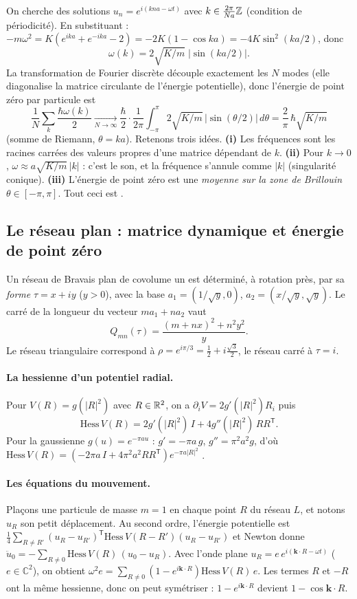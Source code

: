 On cherche des solutions $u_n=e^{i(kna-\omega t)}$ avec $k\in\tfrac{2\pi}{Na}\mathbb{Z}$ (condition de périodicité). En
substituant : $-m\omega^2=K(e^{ika}+e^{-ika}-2)=-2K(1-\cos ka)=-4K\sin^2(ka/2)$, donc
\[
\omega(k)=2\sqrt{K/m}\;\bigl|\sin(ka/2)\bigr| .
\]
La transformation de Fourier discrète découple exactement les $N$ modes (elle diagonalise la matrice circulante de
l'énergie potentielle), donc l'énergie de point zéro par particule est
\[
\frac1N\sum_k\frac{\hbar\omega(k)}2\xrightarrow[N\to\infty]{}\frac{\hbar}{2}\cdot\frac1{2\pi}\int_{-\pi}^{\pi}2\sqrt{K/m}\,
|\sin(\theta/2)|\,d\theta=\frac{2}{\pi}\,\hbar\sqrt{K/m}
\]
(somme de Riemann, $\theta=ka$). Retenons trois idées. \textbf{(i)} Les fréquences sont les racines carrées des valeurs
propres d'une matrice dépendant de $k$. \textbf{(ii)} Pour $k\to0$, $\omega\approx a\sqrt{K/m}\,|k|$ : c'est le son, et
la fréquence s'annule comme $|k|$ (singularité conique). \textbf{(iii)} L'énergie de point zéro est une \emph{moyenne sur
la zone de Brillouin} $\theta\in[-\pi,\pi]$. Tout ceci est \tierC.

\subsection{Le réseau plan : matrice dynamique et énergie de point zéro}\label{ch3:sec:matdyn}
Un réseau de Bravais plan de covolume un est déterminé, à rotation près, par sa \emph{forme} $\tau=x+iy$ ($y>0$), avec la
base $a_1=(1/\sqrt y,0)$, $a_2=(x/\sqrt y,\sqrt y)$. Le carré de la longueur du vecteur $ma_1+na_2$ vaut
\[
Q_{mn}(\tau)=\frac{(m+nx)^2+n^2y^2}{y}.
\]
Le réseau triangulaire correspond à $\rho=e^{i\pi/3}=\tfrac12+i\tfrac{\sqrt3}2$, le réseau carré à $\tau=i$.

\paragraph{La hessienne d'un potentiel radial.} Pour $V(R)=g(|R|^2)$ avec $R\in\mathbb{R}^2$, on a
$\partial_iV=2g'(|R|^2)R_i$ puis
\begin{equation}\label{ch3:eq:hess}
\mathrm{Hess}\,V(R)=2g'(|R|^2)\,I+4g''(|R|^2)\,RR^{\mathsf T}.
\end{equation}
Pour la gaussienne $g(u)=e^{-\pi au}$ : $g'=-\pi a\,g$, $g''=\pi^2a^2g$, d'où
$\mathrm{Hess}\,V(R)=(-2\pi a\,I+4\pi^2a^2RR^{\mathsf T})e^{-\pi a|R|^2}$ \tierC.

\paragraph{Les équations du mouvement.} Plaçons une particule de masse $m=1$ en chaque point $R$ du réseau $L$, et notons
$u_R$ son petit déplacement. Au second ordre, l'énergie potentielle est
$\tfrac14\sum_{R\ne R'}(u_R-u_{R'})^{\mathsf T}\mathrm{Hess}\,V(R-R')(u_R-u_{R'})$ et Newton donne
$\ddot u_{0}=-\sum_{R\neq0}\mathrm{Hess}\,V(R)\,(u_0-u_R)$. Avec l'onde plane $u_R=e\,e^{i(\mathbf k\cdot R-\omega t)}$
($e\in\mathbb{C}^2$), on obtient $\omega^2e=\sum_{R\ne0}(1-e^{i\mathbf k\cdot R})\mathrm{Hess}\,V(R)\,e$. Les termes $R$
et $-R$ ont la même hessienne, donc on peut symétriser : $1-e^{i\mathbf k\cdot R}$ devient $1-\cos\mathbf k\cdot R$.

